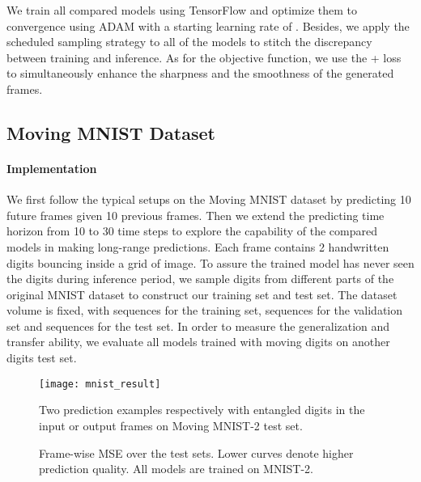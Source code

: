 \documentclass{article}
\begin{document}
We train all compared models using TensorFlow \cite{Abadi2016TensorFlow} and optimize them to convergence using ADAM \cite{Kingma2014Adam} with a starting learning rate of . Besides, we apply the scheduled sampling strategy \cite{bengio2015scheduled} to all of the models to stitch the discrepancy between training and inference. As for the objective function, we use the  +  loss to simultaneously enhance the sharpness and the smoothness of the generated frames.


\subsection{Moving MNIST Dataset}

\paragraph{Implementation}
We first follow the typical setups on the Moving MNIST dataset by predicting 10 future frames given 10 previous frames. Then we extend the predicting time horizon from 10 to 30 time steps to explore the capability of the compared models in making long-range predictions.
Each frame contains 2 handwritten digits bouncing inside a  grid of image. To assure the trained model has never seen the digits during inference period, we sample digits from different parts of the original MNIST dataset to construct our training set and test set. The dataset volume is fixed, with  sequences for the training set,  sequences for the validation set and  sequences for the test set. In order to measure the generalization and transfer ability, we evaluate all models trained with  moving digits on another  digits test set.



\begin{figure}[htb]
\vskip 0.15in
\centering
\texttt{[image: mnist\_result]}
\caption{Two prediction examples respectively with entangled digits in the input or output frames on Moving MNIST-2 test set.}
\label{fig:mnist_result}
\end{figure}



\begin{figure}[htb]
\centering
{}
\caption{Frame-wise MSE over the test sets. Lower curves denote higher prediction quality. All models are trained on MNIST-2.}
\label{fig:mnist_frame_mse}
\end{figure}
\end{document}
